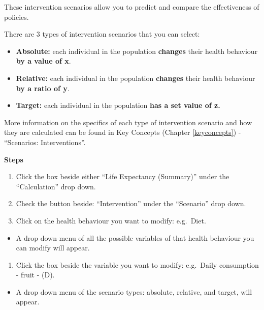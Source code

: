 \documentclass[]{book}
\providecommand{\tightlist}{%
  \setlength{\itemsep}{0pt}\setlength{\parskip}{0pt}}
\begin{document}
These intervention scenarios allow you to predict and compare the
effectiveness of policies.

There are 3 types of intervention scenarios that you can select:

\begin{itemize}
\tightlist
\item
  \textbf{Absolute:} each individual in the population \textbf{changes}
  their health behaviour \textbf{by a value of x}.
\item
  \textbf{Relative:} each individual in the population \textbf{changes}
  their health behaviour \textbf{by a ratio of y}.
\item
  \textbf{Target:} each individual in the population \textbf{has a set
  value of z.}
\end{itemize}

More information on the specifics of each type of intervention scenario
and how they are calculated can be found in Key Concepts (Chapter
\ref{keyconcepts}) - ``Scenarios: Interventions''.

\textbf{Steps}

\begin{enumerate}
\def\labelenumi{\arabic{enumi}.}
\item
  Click the box beside either ``Life Expectancy (Summary)'' under the
  ``Calculation'' drop down.
\item
  Check the button beside: ``Intervention'' under the ``Scenario'' drop
  down.
\item
  Click on the health behaviour you want to modify: e.g.~Diet.
\end{enumerate}

\begin{itemize}
\tightlist
\item
  A drop down menu of all the possible variables of that health
  behaviour you can modify will appear.
\end{itemize}

\begin{enumerate}
\def\labelenumi{\arabic{enumi}.}
\setcounter{enumi}{3}
\tightlist
\item
  Click the box beside the variable you want to modify: e.g.~Daily
  consumption - fruit - (D).
\end{enumerate}

\begin{itemize}
\tightlist
\item
  A drop down menu of the scenario types: absolute, relative, and
  target, will appear.
\end{itemize}
\end{document}
